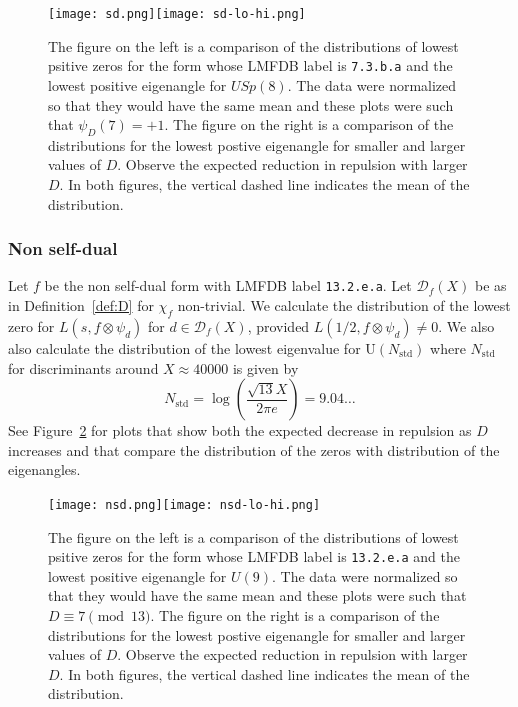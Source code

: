 \documentclass[11pt]{amsart}
\begin{document}
\begin{figure}  
\texttt{[image: sd.png]}\hfill \texttt{[image: sd-lo-hi.png]}
\caption{The figure on the left is a comparison of the distributions of lowest psitive zeros for the form whose LMFDB label is \texttt{7.3.b.a} and the lowest positive eigenangle for $USp(8)$.  The data were normalized so that they would have the same mean and these plots were such that $\psi_D(7) = +1$.  The figure on the right is a comparison of the distributions for the lowest postive eigenangle for smaller and larger values of $D$.  Observe the expected reduction in repulsion with larger $D$. In both figures, the vertical dashed line indicates the mean of the distribution. }\label{fig:sd-plots}
\end{figure}



\subsubsection{Non self-dual} 

Let $f$ be the non self-dual form with LMFDB label \texttt{13.2.e.a}. Let $\mathscr{D}_f (X )$ be as in Definition~\ref{def:D} for $\chi_f$ non-trivial. We calculate the distribution of the lowest zero for $L(s, f \otimes \psi_d )$ for $d \in \mathscr{D}_f (X )$, provided $L(1/2, f \otimes \psi_d ) \neq 0$. We also also calculate the distribution of the lowest eigenvalue for $\textrm{U}(N_{\text{std}} )$ where $N_\text{std}$ for discriminants around $X\approx 40000$ is given by 
\[
N_\text{std} = \log\left (\frac{\sqrt{13}X}{2\pi e}\right ) = 9.04\dots
\]
See Figure~\ref{fig:nsd-plots} for plots that show both the expected decrease in repulsion as $D$ increases and that compare the distribution of the zeros with distribution of the eigenangles.

\begin{figure}  
\texttt{[image: nsd.png]}\hfill \texttt{[image: nsd-lo-hi.png]}
\caption{The figure on the left is a comparison of the distributions of lowest psitive zeros for the form whose LMFDB label is \texttt{13.2.e.a} and the lowest positive eigenangle for $U(9)$.  The data were normalized so that they would have the same mean and these plots were such that $D \equiv 7 \pmod{13}$.  The figure on the right is a comparison of the distributions for the lowest postive eigenangle for smaller and larger values of $D$.  Observe the expected reduction in repulsion with larger $D$. In both figures, the vertical dashed line indicates the mean of the distribution.}\label{fig:nsd-plots}
\end{figure}
\end{document}
